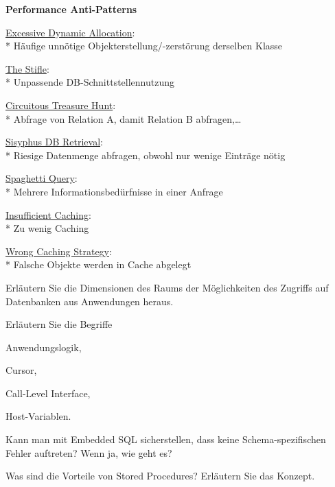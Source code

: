 \textbf{Performance Anti-Patterns}
\begin{items}
	\item \underline{Excessive Dynamic Allocation}:
		\\*
		Häufige unnötige Objekterstellung/-zerstörung derselben Klasse
	\item \underline{The Stifle}:
		\\*
		Unpassende DB-Schnittstellennutzung
	\item \underline{Circuitous Treasure Hunt}:
		\\*
		Abfrage von Relation A, damit Relation B abfragen,\dots
	\item \underline{Sisyphus DB Retrieval}:
		\\*
		Riesige Datenmenge abfragen, obwohl nur wenige Einträge nötig
	\item \underline{Spaghetti Query}:
		\\*
		Mehrere Informationsbedürfnisse in einer Anfrage
	\item \underline{Insufficient Caching}:
		\\*
		Zu wenig Caching
	\item \underline{Wrong Caching Strategy}:
		\\*
		Falsche Objekte werden in Cache abgelegt
\end{items}

\begin{fragen}
	\begin{enumeration}
		\item Erläutern Sie die Dimensionen des Raums der Möglichkeiten des Zugriffs auf Datenbanken aus Anwendungen heraus.
		\item Erläutern Sie die Begriffe
		\begin{enumeration}
			\item Anwendungslogik,
			\item Cursor,
			\item Call-Level Interface,
			\item Host-Variablen.
		\end{enumeration}
		\item Kann man mit Embedded SQL sicherstellen, dass keine Schema-spezifischen Fehler auftreten? Wenn ja, wie geht es?
		\item Was sind die Vorteile von Stored Procedures? Erläutern Sie das Konzept.
	\end{enumeration}
\end{fragen}